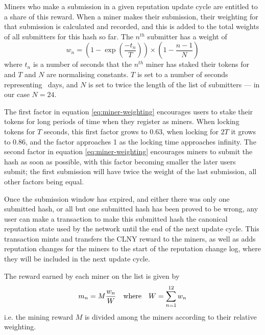 Miners who make a submission in a given reputation update cycle are entitled to a share of this reward. When a miner makes their submission, their weighting for that submission is calculated and recorded, and this is added to the total weights of all submitters for this hash so far. The $n^{th}$ submitter has a weight of
\begin{equation}\label{eq:miner-weighting}
 w_n = \left(1 - \exp\left(\frac{-t_n}{T}\right)\right) \times \left( 1 - \frac{n-1}{N} \right)
\end{equation}
where $t_n$ is a number of seconds that the $n^{th}$ miner has staked their tokens for and $T$ and $N$ are normalising constants. $T$ is set to a number of seconds representing \miningstakeduration\ days, and $N$ is set to twice the length of the list of submitters --- in our case $N=24$.

The first factor in equation \eqref{eq:miner-weighting} encourages users to stake their tokens for long periods of time when they register as miners. When locking tokens for $T$ seconds, this first factor grows to 0.63, when locking for $2T$ it grows to 0.86, and the factor approaches 1 as the locking time approaches infinity. The second factor in equation \eqref{eq:miner-weighting} encourages miners to submit the hash as soon as possible, with this factor becoming smaller the later users submit; the first submission will have twice the weight of the last submission, all other factors being equal.

Once the submission window has expired, and either there was only one submitted hash, or all but one submitted hash has been proved to be wrong, any user can make a transaction to make this submitted hash the canonical reputation state used by the network until the end of the next update cycle. This transaction mints and transfers the CLNY reward to the miners, as well as adds reputation changes for the miners to the start of the reputation change log, where they will be included in the next update cycle.

The reward earned by each miner on the list is given by
\begin{equation}\label{eq:miner-payout}
 m_n = M \frac{w_n}{W} \quad \textnormal{where} \quad W = \sum_{n=1}^{12} w_n
\end{equation}
i.e. the mining reward $M$ is divided among the miners according to their relative weighting.


